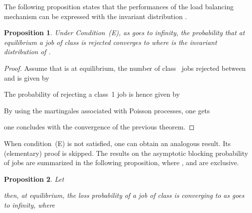 \documentclass{amsart}
\newtheorem{proposition}{Proposition}
\begin{document}
The following proposition states that the performances of the load balancing mechanism can be expressed with the invariant distribution .

\begin{proposition}
Under Condition~(E), as  goes to infinity, the probability that at equilibrium a job of class  is rejected converges to 
where  is the invariant distribution of .
\end{proposition}

\begin{proof}
Assume that  is at equilibrium, the number of class~ jobs rejected between  and  is given by

The probability of rejecting a class~1 job is hence given by 


By using the martingales associated with Poisson processes, one gets

one concludes with the convergence of the previous theorem. 
\end{proof}
When condition~(E) is not satisfied, one can obtain an analogous result. Its (elementary) proof is skipped. 
The results on the asymptotic blocking probability of jobs are summarized in the following proposition, where ,  and  are exclusive.
\begin{proposition}\label{othercases}
Let

then, at equilibrium, the loss probability of a job of class  is converging to  as  goes to infinity, where

\end{proposition}
\end{document}
